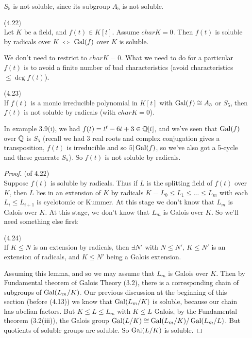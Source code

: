 \documentclass[a4paper]{article}
\begin{document}
\begin{eg}
$S_5$ is not soluble, since its subgroup $A_5$ is not soluble.
\end{eg}

\begin{thm} (4.22)\\
Let $K$ be a field, and $f(t) \in K[t]$. Assume $char K = 0$. Then $f(t)$ is soluble by radicals over $K$ $\iff$ $\operatorname{Gal}(f)$ over $K$ is soluble.
\begin{rem}
We don't need to restrict to $charK = 0$. What we need to do for a particular $f(t)$ is to avoid a finite number of bad characteristics (avoid characteristics $\leq \deg f(t)$).
\end{rem}
\end{thm}

\begin{coro} (4.23)\\
If $f(t)$ is a monic irreducible polynomial in $K[t]$ with $\operatorname{Gal}(f) \cong A_5$ or $S_5$, then $f(t)$ is not soluble by radicals (with $char K = 0$).
\end{coro}

\begin{eg}
In example 3.9(i), we had $f(t) = t^t-6t+3 \in \mathbb{Q}[t]$, and we've seen that $\operatorname{Gal}(f)$ over $\mathbb{Q}$ is $S_5$ (recall we had 3 real roots and complex conjugation gives a transposition, $f(t)$ is irreducible and so $5|\operatorname{Gal}(f)$, so we've also got a 5-cycle and these generate $S_5$). So $f(t)$ is not soluble by radicals.
\end{eg}

\begin{proof} (of 4.22)\\
Suppose $f(t)$ is soluble by radicals. Thus if $L$ is the splitting field of $f(t)$ over $K$, then $L$ lies in an extension of $K$ by radicals $K = L_0 \leq L_1 \leq ... \leq L_m$ with each $L_i \leq L_{i+1}$ is cyclotomic or Kummer. At this stage we don't know that $L_m$ is Galois over $K$. At this stage, we don't know that $L_m$ is Galois over $K$. So we'll need something else first:

\begin{lemma} (4.24)\\
If $K \leq N$ is an extension by radicals, then $\exists N'$ with $N \leq N'$, $K \leq N'$ is an extension of radicals, and $K \leq N'$ being a Galois extension.
\end{lemma}

Assuming this lemma, and so we may assume that $L_m$ is Galois over $K$. Then by Fundamental theorem of Galois Theory (3.2), there is a corresponding chain of subgroups of $\operatorname{Gal}(L_m/K)$. Our previous discussion at the beginning of this section (before (4.13)) we know that $\operatorname{Gal}(L_m / K)$ is soluble, because our chain has abelian factors. But $K \leq L \leq L_m$ with $K \leq L$ Galois, by the Fundamental theorem (3.2(iii)), the Galois group $\operatorname{Gal}(L/K) \cong \operatorname{Gal}(L_m/K)/\operatorname{Gal}(L_m/L)$. But quotients of soluble groups are soluble. So $\operatorname{Gal}(L/K)$ is soluble.
\end{proof}
\end{document}
